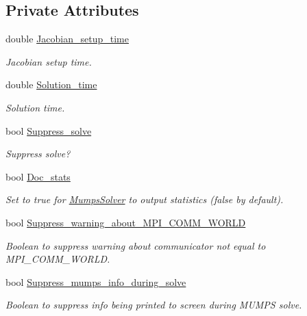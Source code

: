 \subsection*{Private Attributes}
\begin{DoxyCompactItemize}
\item 
double \hyperlink{classoomph_1_1MumpsSolver_a0608ee6d4a166c35a5d2d3756f119780}{Jacobian\+\_\+setup\+\_\+time}
\begin{DoxyCompactList}\small\item\em Jacobian setup time. \end{DoxyCompactList}\item 
double \hyperlink{classoomph_1_1MumpsSolver_a6a5a305985a4215cc3456df54f531900}{Solution\+\_\+time}
\begin{DoxyCompactList}\small\item\em Solution time. \end{DoxyCompactList}\item 
bool \hyperlink{classoomph_1_1MumpsSolver_a851b95821f3adce5545e7abe238b3cce}{Suppress\+\_\+solve}
\begin{DoxyCompactList}\small\item\em Suppress solve? \end{DoxyCompactList}\item 
bool \hyperlink{classoomph_1_1MumpsSolver_a8dc51b4b7e2b121773aea1ed7820ea16}{Doc\+\_\+stats}
\begin{DoxyCompactList}\small\item\em Set to true for \hyperlink{classoomph_1_1MumpsSolver}{Mumps\+Solver} to output statistics (false by default). \end{DoxyCompactList}\item 
bool \hyperlink{classoomph_1_1MumpsSolver_a4a770886867c62d2eff6afe4b091fabd}{Suppress\+\_\+warning\+\_\+about\+\_\+\+M\+P\+I\+\_\+\+C\+O\+M\+M\+\_\+\+W\+O\+R\+LD}
\begin{DoxyCompactList}\small\item\em Boolean to suppress warning about communicator not equal to M\+P\+I\+\_\+\+C\+O\+M\+M\+\_\+\+W\+O\+R\+LD. \end{DoxyCompactList}\item 
bool \hyperlink{classoomph_1_1MumpsSolver_acfc51e1ed214d9d2dc5a83b04a08d1f7}{Suppress\+\_\+mumps\+\_\+info\+\_\+during\+\_\+solve}
\begin{DoxyCompactList}\small\item\em Boolean to suppress info being printed to screen during M\+U\+M\+PS solve. \end{DoxyCompactList}\item 

\end{DoxyCompactItemize}
